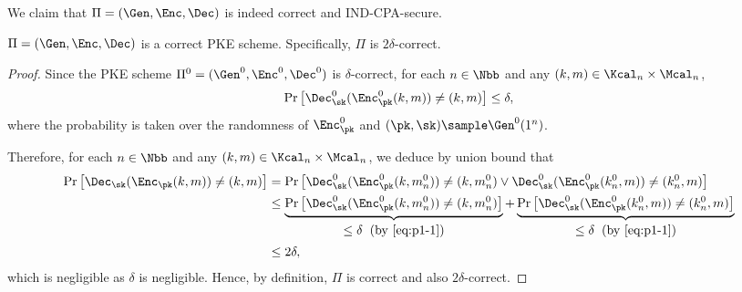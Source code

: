 \begin{answer}
\begin{simplebox}
    \end{simplebox}
     We claim that $\Pi=(\Gen, \Enc, \Dec)$ is indeed correct and IND-CPA-secure.
    \begin{claim}\label{claim:p1-1}
        $\Pi=(\Gen, \Enc, \Dec)$ is a correct PKE scheme. Specifically, $\Pi$ is $2\delta$-correct. 
    \end{claim}
    \begin{proof}
        Since the PKE scheme $\Pi^0=(\Gen^0, \Enc^0, \Dec^0)$ is $\delta$-correct, for each $n\in\Nbb$ and any $(k,m)\in\Kcal_n\times \Mcal_n$,
        \begin{equation}\label{eq:p1-1}
            \Pr\left[\Dec^0_\sk(\Enc^0_\pk(k,m))\neq (k,m) \right] \le \delta,
        \end{equation}
        where the probability is taken over the randomness of $\Enc^0_\pk$ and $(\pk,\sk)\sample\Gen^0(1^n)$.

        Therefore, for each $n\in\Nbb$ and any $(k,m)\in\Kcal_n\times \Mcal_n$, we deduce by union bound that
        \begin{align*}
            \Pr\left[\Dec_\sk(\Enc_\pk(k,m))\neq (k,m) \right]
            &= \Pr\left[\Dec^0_\sk(\Enc^0_\pk(k,m^0_n))\neq (k,m^0_n) \lor \Dec^0_\sk(\Enc^0_\pk(k^0_n, m))\neq (k^0_n, m)  \right]\\
            &\le \underbrace{\Pr\left[\Dec^0_\sk(\Enc^0_\pk(k,m^0_n))\neq (k,m^0_n)\right]}_{\begin{gathered}\le \delta \;\; \textrm{(by \eqref{eq:p1-1})}\end{gathered}}+\underbrace{\Pr\left[\Dec^0_\sk(\Enc^0_\pk(k^0_n, m))\neq (k^0_n, m)  \right]}_{\begin{gathered}\le \delta\;\; \textrm{(by \eqref{eq:p1-1})}\end{gathered}}\\
            &\le 2\delta,
        \end{align*}
        which is negligible as $\delta$ is negligible. Hence, by definition, $\Pi$ is correct and also $2\delta$-correct. 
    \end{proof}


\end{answer}
